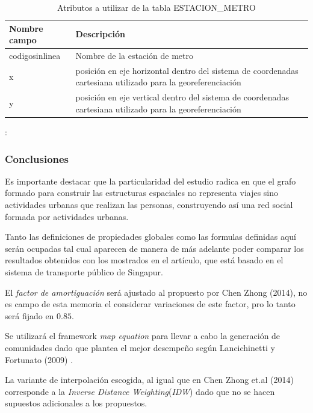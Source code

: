 \documentclass[12pt]{article}
\begin{document}

\begin{table}[H]
\begin{center}
  \begin{tabular}{| l | p{7cm} |}
    \hline
    Nombre campo & Descripción \\ \hline \hline
    codigosinlinea & Nombre de la estación de metro \\ \hline
    x & posición en eje horizontal dentro del sistema de coordenadas cartesiana utilizado para la georeferenciación \\ \hline
    y & posición en eje vertical dentro del sistema de coordenadas cartesiana utilizado para la georeferenciación \\ \hline
  \end{tabular}
\end{center}
\caption{Atributos a utilizar de la tabla ESTACION\_METRO}:
\label{tabla:estacion_metro}
\end{table}


    \subsubsection{Conclusiones}
    
	Es importante destacar que la particularidad del estudio radica en que el grafo formado para construir las estructuras espaciales no representa viajes sino actividades urbanas que realizan las personas, construyendo así una red social formada por actividades urbanas.
	
	Tanto las definiciones de propiedades globales como las formulas definidas aquí serán ocupadas tal cual aparecen de manera de más adelante poder comparar los resultados obtenidos con los mostrados en el artículo, que está basado en el sistema de transporte público de Singapur.

	El \textit{factor de amortiguación} será ajustado al propuesto por Chen Zhong (2014)\cite{Estructura_urbana}, no es campo de esta memoria el considerar variaciones de este factor, pro lo tanto será fijado en $0.85$.

	Se utilizará el framework \textit{map equation}	 para llevar a cabo la generación de comunidades dado que plantea el mejor desempeño según Lancichinetti y Fortunato (2009) \cite{Comparar_generador_comunidad}.
	
La variante de interpolación escogida, al igual que en Chen Zhong et.al (2014) corresponde a la \textit{Inverse Distance Weighting}(\textit{IDW}) dado que no se hacen supuestos adicionales a los propuestos.
	
\end{document}
